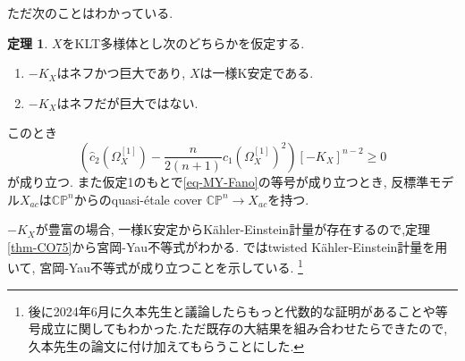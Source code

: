 \documentclass[dvipdfmx]{msjproc}
\theoremstyle{definition}
\newtheorem{thm}{定理}[section]
\newcommand{\C}{\mathbb{C}}
\begin{document}
ただ次のことはわかっている. 
\begin{thm}\cite{CO75}\cite{Hisa24}\cite{Ou17}
\label{thm-MY-Fano}
$X$をKLT多様体とし次のどちらかを仮定する.
\begin{enumerate}
  \setlength{\parskip}{0cm} 
  \setlength{\itemsep}{0cm} 
 \item $-K_X$はネフかつ巨大であり, $X$は一様K安定である. 
 \item $-K_X$はネフだが巨大ではない.
\end{enumerate}
このとき
\begin{equation}
\label{eq-MY-Fano}
\left(\widehat{c}_2(\Omega_{X}^{[1]}) - \frac{n}{2(n+1)}c_1(\Omega_{X}^{[1]})^{2} \right)
 [-K_{X}]^{n-2}\ge 0
\end{equation}
が成り立つ. 
また仮定1のもとで\eqref{eq-MY-Fano}の等号が成り立つとき, 反標準モデル$X_{ac}$は$\C\mathbb{P}^n$からのquasi-\'etale cover $\C\mathbb{P}^n \to X_{ac}$を持つ.
\end{thm}
$-K_X$が豊富の場合, 一様K安定からK\"ahler-Einstein計量が存在するので,定理\ref{thm-CO75}から宮岡-Yau不等式がわかる. 
\cite{Hisa24}ではtwisted K\"ahler-Einstein計量を用いて, 宮岡-Yau不等式が成り立つことを示している. \footnote{後に2024年6月に久本先生と議論したらもっと代数的な証明があることや等号成立に関してもわかった.ただ既存の大結果を組み合わせたらできたので, 久本先生の論文に付け加えてもらうことにした.}
\end{document}
